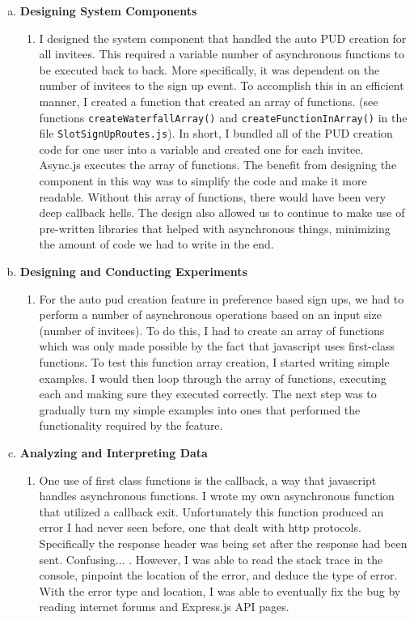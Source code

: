 \documentclass[11pt]{article}   %
\begin{document}
\begin{enumerate} [a)]
\item {\bf Designing System Components}
\begin{enumerate} [$\cdot$]
\item I designed the system component that handled the auto PUD creation for all invitees. This required a variable number of asynchronous functions to be executed back to back. More specifically, it was dependent on the number of invitees to the sign up event. To accomplish this in an efficient manner, I created a function that created an array of functions. (see functions \texttt{createWaterfallArray()} and \texttt{createFunctionInArray()} in the file \texttt{SlotSignUpRoutes.js}). In short, I bundled all of the PUD creation code for one user into a variable and created one for each invitee. Async.js executes the array of functions. The benefit from designing the component in this way was to simplify the code and make it more readable. Without this array of functions, there would have been very deep callback hells. The design also allowed us to continue to make use of pre-written libraries that helped with asynchronous things, minimizing the amount of code we had to write in the end.
\end{enumerate}
\item  {\bf Designing and Conducting Experiments}
\begin{enumerate} [$\cdot$]
\item For the auto pud creation feature in preference based sign ups, we had to perform a number of asynchronous operations based on an input size (number of invitees). To do this, I had to create an array of functions which was only made possible by the fact that javascript uses first-class functions. To test this function array creation, I started writing simple examples. I would then loop through the array of functions, executing each and making sure they executed correctly. The next step was to gradually turn my simple examples into ones that performed the functionality required by the feature. 
\end{enumerate}	
\item  {\bf Analyzing and Interpreting Data}
\begin{enumerate} [$\cdot$]
\item One use of first class functions is the callback, a way that javascript handles asynchronous functions. I wrote my own asynchronous function that utilized a callback exit. Unfortunately this function produced an error I had never seen before, one that dealt with http protocols. Specifically the response header was being set after the response had been sent. Confusing... . However, I was able to read the stack trace in the console, pinpoint the location of the error, and deduce the type of error. With the error type and location, I was able to eventually fix the bug by reading internet forums and Express.js API pages.

\end{enumerate}
\end{enumerate}
\end{document}
